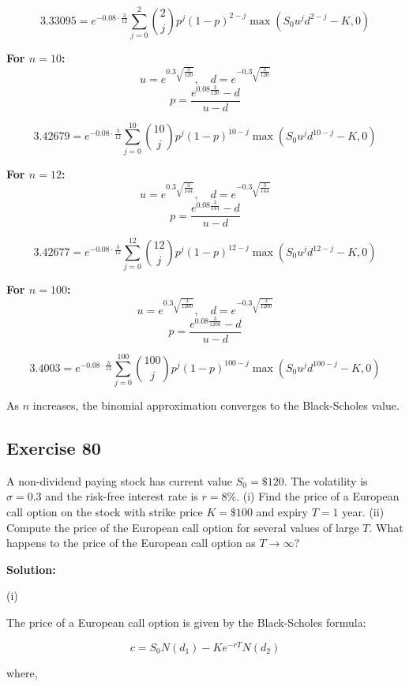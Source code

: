 \documentclass{article}
\begin{document}
\[
3.33095 = e^{-0.08 \cdot \frac{3}{12}} \sum_{j=0}^{2} \binom{2}{j} p^j (1-p)^{2-j} \max(S_0 u^j d^{2-j} - K, 0)
\]

\textbf{For \( n = 10 \):}
\[
u = e^{0.3 \sqrt{\frac{3}{120}}}, \quad d = e^{-0.3 \sqrt{\frac{3}{120}}}
\]
\[
p = \frac{e^{0.08 \frac{3}{120}} - d}{u - d}
\]

\[
3.42679 = e^{-0.08 \cdot \frac{3}{12}} \sum_{j=0}^{10} \binom{10}{j} p^j (1-p)^{10-j} \max(S_0 u^j d^{10-j} - K, 0)
\]

\textbf{For \( n = 12 \):}
\[
u = e^{0.3 \sqrt{\frac{3}{144}}}, \quad d = e^{-0.3 \sqrt{\frac{3}{144}}}
\]
\[
p = \frac{e^{0.08 \frac{3}{144}} - d}{u - d}
\]

\[
3.42677 = e^{-0.08 \cdot \frac{3}{12}} \sum_{j=0}^{12} \binom{12}{j} p^j (1-p)^{12-j} \max(S_0 u^j d^{12-j} - K, 0)
\]

\textbf{For \( n = 100 \):}
\[
u = e^{0.3 \sqrt{\frac{3}{1200}}}, \quad d = e^{-0.3 \sqrt{\frac{3}{1200}}}
\]
\[
p = \frac{e^{0.08 \frac{3}{1200}} - d}{u - d}
\]

\[
3.4003 = e^{-0.08 \cdot \frac{3}{12}} \sum_{j=0}^{100} \binom{100}{j} p^j (1-p)^{100-j} \max(S_0 u^j d^{100-j} - K, 0)
\]

As \( n \) increases, the binomial approximation converges to the Black-Scholes value. 

\subsection*{Exercise 80}

A non-dividend paying stock has current value \( S_0 = \$120 \). The volatility is \( \sigma = 0.3 \) and the risk-free interest rate is \( r = 8\% \). (i) Find the price of a European call option on the stock with strike price \( K = \$100 \) and expiry \( T = 1 \) year. (ii) Compute the price of the European call option for several values of large \( T \). What happens to the price of the European call option as \( T \to \infty \)?

\vspace{\baselineskip}

\textbf{Solution:}

\vspace{\baselineskip}

(i)

The price of a European call option is given by the Black-Scholes formula:

\[
c = S_0 N(d_1) - Ke^{-rT} N(d_2)
\]

where,
\end{document}
